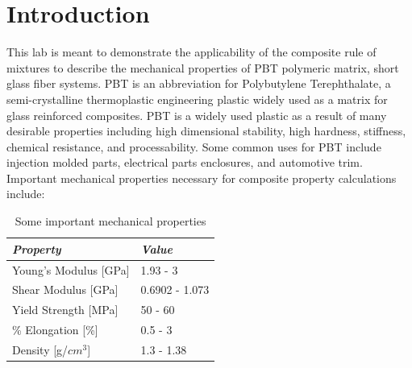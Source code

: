 \documentclass[11pt]{article}
\begin{document}
\tableofcontents
\newpage
\listoffigures
\newpage
\listoftables
\newpage

\section{Introduction}
This lab is meant to demonstrate the applicability of the composite rule of mixtures to describe the mechanical properties of PBT polymeric matrix, short glass fiber systems. 
PBT is an abbreviation for Polybutylene Terephthalate, a semi-crystalline thermoplastic engineering plastic widely used as a matrix for glass reinforced composites. PBT is a widely used plastic as a result of many desirable properties including high dimensional stability, high hardness, stiffness, chemical resistance, and processability. Some common uses for PBT include injection molded parts, electrical parts enclosures, and automotive trim. Important mechanical properties necessary for composite property calculations include:


\begin{table}[htb!]
\caption{Some important mechanical properties}
\label{mechProperties}
\begin{center}
\begin{tabular}{ p{6cm} || p{2cm}}
\textit{\textbf{Property}}& \textit{\textbf{Value}}\\
\hline

Young's Modulus [GPa] &  
\begin{minipage}[t]{1\textwidth}
	1.93 - 3
\end{minipage}\\

Shear Modulus [GPa] &  
\begin{minipage}[t]{1\textwidth}
	0.6902 - 1.073
\end{minipage}\\

Yield Strength [MPa] &  
\begin{minipage}[t]{1\textwidth}
	50 - 60
\end{minipage}\\ 

\% Elongation [\%] &  
\begin{minipage}[t]{1\textwidth}
	0.5 - 3
\end{minipage}\\ 

Density [g/\(cm^3\)] &  
\begin{minipage}[t]{1\textwidth}
	1.3 - 1.38
\end{minipage}\\ 

\end{tabular}
\end{center}
\end{table}
\end{document}
